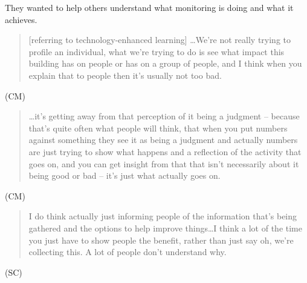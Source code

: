 They wanted to help others understand what monitoring is doing and
what it achieves.

\begin{quote}[referring to technology-enhanced learning] \ldots We’re not really
trying to profile an individual, what we’re trying to do is see what
impact this building has on people or has on a group of people, and I
think when you explain that to people then it’s usually not too bad.\end{quote}
(CM) 

\begin{quote}\ldots it’s getting away from that perception of it being a judgment –
because that’s quite often what people will think, that when you put
numbers against something they see it as being a judgment and actually
numbers are just trying to show what happens and a reflection of the
activity that goes on, and you can get insight from that that isn’t
necessarily about it being good or bad – it’s just what actually goes
on.\end{quote} (CM)

\begin{quote}I do think actually just informing people of the information that’s
being gathered and the options to help improve things\ldots I think a lot
of the time you just have to show people the benefit, rather than just
say oh, we’re collecting this. A lot of people don’t understand why.\end{quote}
(SC)





